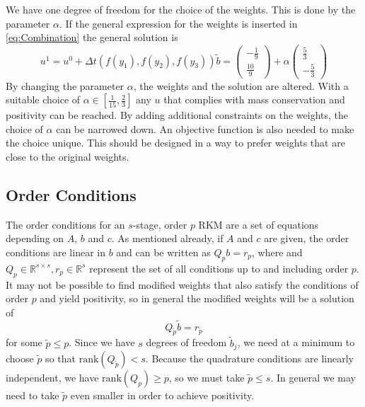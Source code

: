 \documentclass[a4paper]{article}
\numberwithin{equation}{section}
\theoremstyle{plain}
\theoremstyle{definition}
\numberwithin{theorem}{section}
\newcommand{\dt}{{\Delta t}}
\newcommand{\1}{\mathbbm{1}}
\newcommand{\bt}{\tilde{b}}
\newcommand{\pt}{{\tilde{p}}}
\begin{document}
We have one degree of freedom for the choice of the weights. This is done by the parameter $\alpha$.
If the general expression for the weights is inserted in \eqref{eq:Combination} the general solution is 
\begin{equation}
u^{1} = u^0 + \dt  \left(f(y_1),f(y_2),f(y_3)\right) \tilde{b} =
\left(\begin{matrix}- \frac{1}{9}\\\frac{10}{9}\end{matrix}\right) +\alpha \left(\begin{matrix}\frac{5}{3}\\- \frac{5}{3}\end{matrix}\right)
\end{equation}
By changing the parameter $\alpha$, the weights and the solution are altered.
With a suitable choice of $\alpha \in \left[\frac{1}{15},\frac{2}{3}\right]$ any $u$ that complies with mass conservation and positivity can be reached. 
By adding additional constraints on the weights, the choice of $\alpha$ can be narrowed down. 
An objective function is also needed to make the choice unique. This should be designed in a way to prefer weights that are close to the original weights.







\subsection{Order Conditions}\label{sec:OrderCond}

The order conditions for an $s$-stage, order $p$ RKM are a set of equations depending on $A$, $b$ and
$c$.  As mentioned already, if $A$ and $c$ are given, the order conditions are
linear in $b$ and can be written as $Q_p b = r_p$, where
and $Q_p\in{\mathbb R}^{s\times s}, r_p\in{\mathbb R}^s$ represent the set of all conditions up to
and including order $p$.  It may not be possible to find modified weights
that also satisfy the conditions of order $p$ and yield positivity, so
in general the modified weights will be a solution of
$$
  Q_\pt \bt = r_\pt
$$
for some $\pt \le p$.   Since we have $s$ degrees of freedom $\bt_j$,  we need
at a minimum to choose $\pt$ so that $\mathrm{rank}(Q_\pt) < s$. 
Because the quadrature conditions are linearly independent, we have $\mathrm{rank}(Q_p)\ge p$,
so we must take $\pt \le s$.  In general we may need to take $\pt$ even smaller
in order to achieve positivity.
\end{document}

